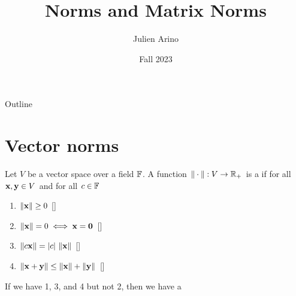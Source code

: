 \documentclass[aspectratio=169]{beamer}
\title{Norms and Matrix Norms}
\author{Julien Arino}
\date{Fall 2023}
\begin{document}
\begin{frame}
	\titlepage
\end{frame}
\addtocounter{page}{-1}
  
  
\begin{frame}{Outline}
	  \tableofcontents[hideallsubsections]
\end{frame}
\addtocounter{page}{-1}


\section{Vector norms}
\label{sec:vector_norms}


\begin{frame}
\begin{definition}[Norm]
Let $V$ be a vector space over a field $\mathbb{F}$. A function $\| \cdot \|: V\to \mathbb{R}_{+}$ is a  if for all $\mathbf{x},\mathbf{y}\in V$ and for all $c\in \mathbb{F}$
\begin{enumerate}
    \item $\|\mathbf{x}\| \geq 0$ \hfill[]
    \item $\|\bx\|=0 \iff\bx=\b0$ \hfill[]
    \item $\|c\mathbf{x}\| =|c|\ \|\mathbf{x}\|$ \hfill[]
    \item $\|\mathbf{x}+\mathbf{y} \|\leq \|\mathbf{x}\| + \|\mathbf{y}\|$ \hfill[]
\end{enumerate}
\end{definition}
\vfill
\begin{remark}
If we have 1, 3, and 4 but not 2, then we have a 
\end{remark}
\end{frame}
\end{document}
